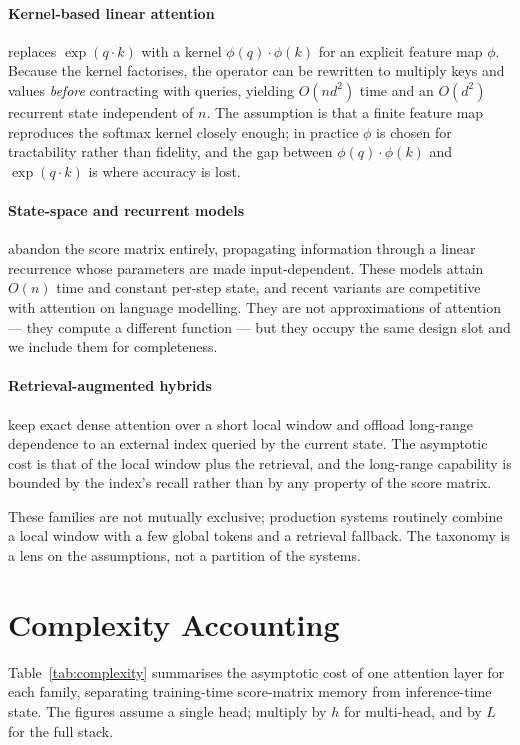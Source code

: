 \documentclass[11pt]{article}
\begin{document}
\paragraph{Kernel-based linear attention} replaces $\exp(q \cdot k)$ with a kernel $\phi(q) \cdot \phi(k)$ for an explicit feature map $\phi$. Because the kernel factorises, the operator can be rewritten to multiply keys and values \emph{before} contracting with queries, yielding $O(n d^2)$ time and an $O(d^2)$ recurrent state independent of $n$. The assumption is that a finite feature map reproduces the softmax kernel closely enough; in practice $\phi$ is chosen for tractability rather than fidelity, and the gap between $\phi(q)\cdot\phi(k)$ and $\exp(q\cdot k)$ is where accuracy is lost.

\paragraph{State-space and recurrent models} abandon the score matrix entirely, propagating information through a linear recurrence whose parameters are made input-dependent. These models attain $O(n)$ time and constant per-step state, and recent variants are competitive with attention on language modelling. They are not approximations of attention --- they compute a different function --- but they occupy the same design slot and we include them for completeness.

\paragraph{Retrieval-augmented hybrids} keep exact dense attention over a short local window and offload long-range dependence to an external index queried by the current state. The asymptotic cost is that of the local window plus the retrieval, and the long-range capability is bounded by the index's recall rather than by any property of the score matrix.

These families are not mutually exclusive; production systems routinely combine a local window with a few global tokens and a retrieval fallback. The taxonomy is a lens on the assumptions, not a partition of the systems.

\section{Complexity Accounting}
\label{sec:complexity}

Table~\ref{tab:complexity} summarises the asymptotic cost of one attention layer for each family, separating training-time score-matrix memory from inference-time state. The figures assume a single head; multiply by $h$ for multi-head, and by $L$ for the full stack.
\end{document}
